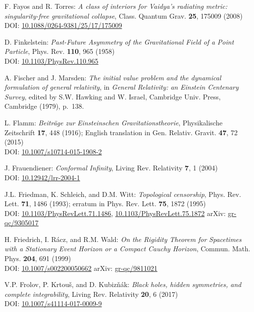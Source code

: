 \begin{thebibliography}{123}
F. Fayos and R. Torres:
{\em A class of interiors for Vaidya's radiating metric: singularity-free gravitational collapse},
Class. Quantum Grav. {\bf 25}, 175009 (2008)\\
DOI: \href{https://doi.org/10.1088/0264-9381/25/17/175009}{10.1088/0264-9381/25/17/175009}

D. Finkelstein:
{\em Past-Future Asymmetry of the Gravitational Field of a Point Particle},
Phys. Rev. {\bf 110}, 965 (1958)\\
DOI: \href{https://doi.org/10.1103/PhysRev.110.965}{10.1103/PhysRev.110.965}

A. Fischer and J. Marsden:
{\em The initial value problem and the dynamical formulation of general relativity},
in {\em General Relativity: an Einstein
Centenary Survey}, edited by S.W. Hawking and W. Israel,
Cambridge Univ. Press, Cambridge (1979), p.~138.

L. Flamm: {\em Beiträge zur Einsteinschen Gravitationstheorie},
Physikalische Zeitschrift {\bf 17}, 448 (1916); English translation in
Gen. Relativ. Gravit. {\bf 47}, 72 (2015)\\
DOI: \href{https://doi.org/10.1007/s10714-015-1908-2}{10.1007/s10714-015-1908-2}

J. Frauendiener:
{\em Conformal Infinity},
Living Rev. Relativity {\bf 7}, 1 (2004) \\
DOI: \href{https://doi.org/10.12942/lrr-2004-1}{10.12942/lrr-2004-1}

J.L. Friedman, K. Schleich, and D.M. Witt:
{\em Topological censorship},
Phys. Rev. Lett. {\bf 71}, 1486 (1993); erratum in Phys. Rev. Lett. {\bf 75}, 1872 (1995)\\
DOI: \href{https://doi.org/10.1103/PhysRevLett.71.1486}{10.1103/PhysRevLett.71.1486},
\href{https://doi.org/10.1103/PhysRevLett.75.1872}{10.1103/PhysRevLett.75.1872}\hfill
arXiv: \href{https://arxiv.org/abs/gr-qc/9305017}{gr-qc/9305017}

H. Friedrich, I. Rácz, and R.M. Wald:
{\em On the Rigidity Theorem for Spacetimes with a Stationary Event Horizon or a Compact Cauchy Horizon},
Commun. Math. Phys. {\bf 204}, 691 (1999)\\
DOI: \href{https://doi.org/10.1007/s002200050662}{10.1007/s002200050662}\hfill
arXiv: \href{https://arxiv.org/abs/gr-qc/9811021}{gr-qc/9811021}

V.P. Frolov, P. Krtouš, and D. Kubizňák:
{\em Black holes, hidden symmetries, and complete integrability},
Living Rev. Relativity {\bf 20}, 6 (2017) \\
DOI: \href{https://doi.org/10.1007/s41114-017-0009-9}{10.1007/s41114-017-0009-9}


\end{thebibliography}
